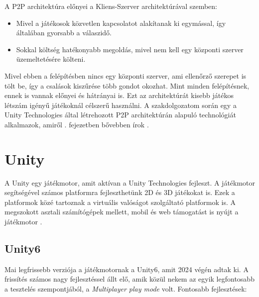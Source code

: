\documentclass[]{thesis-ekf}
\theoremstyle{definition}
\theoremstyle{remark}
\begin{document}
A P2P architektúra előnyei a Kliens-Szerver architektúrával szemben:
\begin{itemize}
	\item Mivel a játékosok közvetlen kapcsolatot alakítanak ki egymással, így általában gyorsabb a válaszidő.
	\item Sokkal költség hatékonyabb megoldás, mivel nem kell egy központi szerver üzemeltetésére költeni.
\end{itemize}

Mivel ebben a felépítésben nincs egy központi szerver, ami ellenőrző szerepet is tölt be, így a csalások kiszűrése több gondot okozhat. Mint minden felépítésnek, ennek is vannak előnyei és hátrányai is. Ezt az architektúrát kisebb játékos létszám igényű játékoknál célszerű használni. A szakdolgozatom során egy a Unity Technologies által létrehozott P2P architektúrán alapuló technológiát alkalmazok, amiről . fejezetben bővebben írok \cite{MediumP2P}.

\chapter{Unity}
\label{ch-unity}

A Unity egy játékmotor, amit aktívan a Unity Technologies fejleszt. A játékmotor segítségével számos platformra fejleszthetünk 2D és 3D játékokat is. Ezek a platformok közé tartoznak a virtuális valóságot szolgáltató platformok is. A megszokott asztali számítógépek mellett, mobil és web támogatást is nyújt a játékmotor \cite{UnityPlatforms}.

\section{Unity6}

Mai legfrissebb verziója a játékmotornak a Unity6, amit 2024 végén adtak ki. A frissítés számos nagy fejlesztéssel állt elő, amik közül nekem az egyik legfontosabb a tesztelés szempontjából, a \emph{Multiplayer play mode} volt. Fontosabb fejlesztések: 
\end{document}
